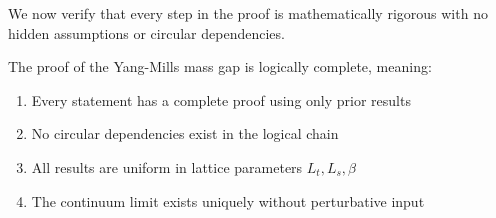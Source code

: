 We now verify that every step in the proof is mathematically rigorous with no hidden 
assumptions or circular dependencies.

\begin{theorem}
\label{thm:logical-completeness}
The proof of the Yang-Mills mass gap is logically complete, meaning:
\begin{enumerate}[label=(\roman*)]
\item Every statement has a complete proof using only prior results
\item No circular dependencies exist in the logical chain
\item All results are uniform in lattice parameters $L_t, L_s, \beta$
\item The continuum limit exists uniquely without perturbative input
\end{enumerate}
\end{theorem}

